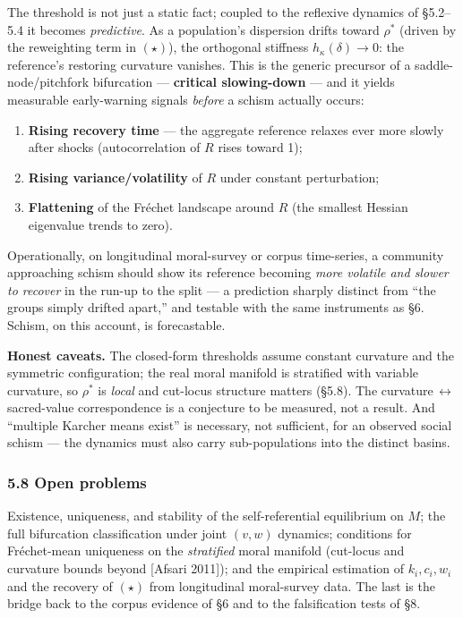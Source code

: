\documentclass[
]{article}
\providecommand{\tightlist}{%
  \setlength{\itemsep}{0pt}\setlength{\parskip}{0pt}}
\begin{document}
The threshold is not just a static fact; coupled to the reflexive
dynamics of §5.2--5.4 it becomes \emph{predictive}. As a population's
dispersion drifts toward \(\rho^{*}\) (driven by the reweighting term in
\((\star)\)), the orthogonal stiffness \(h_\kappa(\delta)\to 0\): the
reference's restoring curvature vanishes. This is the generic precursor
of a saddle-node/pitchfork bifurcation --- \textbf{critical
slowing-down} --- and it yields measurable early-warning signals
\emph{before} a schism actually occurs:

\begin{enumerate}
\def\labelenumi{\arabic{enumi}.}
\tightlist
\item
  \textbf{Rising recovery time} --- the aggregate reference relaxes ever
  more slowly after shocks (autocorrelation of \(R\) rises toward 1);
\item
  \textbf{Rising variance/volatility} of \(R\) under constant
  perturbation;
\item
  \textbf{Flattening} of the Fréchet landscape around \(R\) (the
  smallest Hessian eigenvalue trends to zero).
\end{enumerate}

Operationally, on longitudinal moral-survey or corpus time-series, a
community approaching schism should show its reference becoming
\emph{more volatile and slower to recover} in the run-up to the split
--- a prediction sharply distinct from ``the groups simply drifted
apart,'' and testable with the same instruments as §6. Schism, on this
account, is forecastable.

\textbf{Honest caveats.} The closed-form thresholds assume constant
curvature and the symmetric configuration; the real moral manifold is
stratified with variable curvature, so \(\rho^{*}\) is \emph{local} and
cut-locus structure matters (§5.8). The
curvature\(\,\leftrightarrow\,\)sacred-value correspondence is a
conjecture to be measured, not a result. And ``multiple Karcher means
exist'' is necessary, not sufficient, for an observed social schism ---
the dynamics must also carry sub-populations into the distinct basins.

\subsubsection{5.8 Open problems}\label{open-problems}

Existence, uniqueness, and stability of the self-referential equilibrium
on \(M\); the full bifurcation classification under joint \((v,w)\)
dynamics; conditions for Fréchet-mean uniqueness on the
\emph{stratified} moral manifold (cut-locus and curvature bounds beyond
{[}Afsari 2011{]}); and the empirical estimation of \(k_i, c_i, w_i\)
and the recovery of \((\star)\) from longitudinal moral-survey data. The
last is the bridge back to the corpus evidence of §6 and to the
falsification tests of §8.
\end{document}
